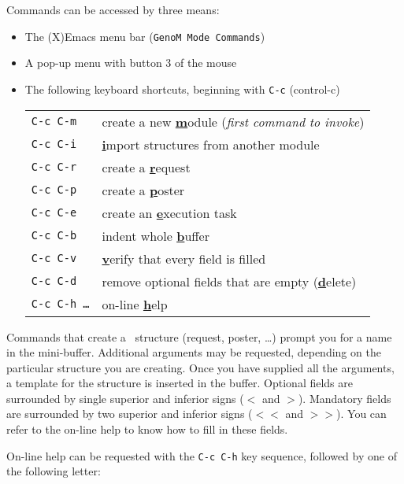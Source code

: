 Commands can be accessed by three means:
\begin{itemize}
\item The (X)Emacs menu bar (\texttt{GenoM Mode Commands})
\item A pop-up menu with button 3 of the mouse
\item The following keyboard shortcuts, beginning with \texttt{C-c} (control-c)

{\small
\begin{tabular}{|l|p{10cm}|}
\hline
\tt C-c C-m & create a new \underline{\textbf{m}}odule  (\emph{first command to invoke})\\
\tt C-c C-i & \underline{\textbf{i}}mport structures from another module\\
\tt C-c C-r & create a \underline{\textbf{r}}equest \\
\tt C-c C-p & create a \underline{\textbf{p}}oster \\
\tt C-c C-e & create an \underline{\textbf{e}}xecution task\\
\hline
\tt C-c C-b & indent whole \underline{\textbf{b}}uffer \\
\tt C-c C-v & \underline{\textbf{v}}erify that every field is filled \\
\tt C-c C-d & remove optional fields that are empty (\underline{\textbf{d}}elete) \\
\hline
\tt C-c C-h \ldots & on-line \underline{\textbf{h}}elp\\
\hline
\end{tabular}}
\end{itemize}

Commands that create a \GenoM\ structure (request, poster, \ldots) prompt
you  for  a   name in  the   mini-buffer.  Additional   arguments may  be
requested, depending on the particular structure you  are creating.  Once
you  have  supplied all the  arguments,  a template  for the structure is
inserted  in the buffer.   Optional   fields  are surrounded  by   single
superior and inferior signs (\texttt{$<$} and \texttt{$>$}). Mandatory  fields
are surrounded by two  superior and inferior signs  (\texttt{$<<$}  and 
\texttt{$>>$}). You  can refer to the  on-line help to know  how to fill in these
fields.

On-line help can be requested with the \texttt{C-c C-h} key sequence,
followed by one of the following letter:

